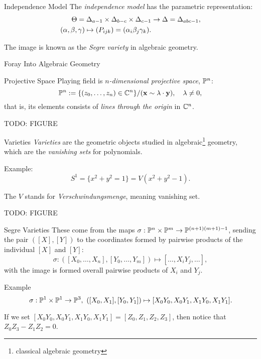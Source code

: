 \begin{frame}{Independence Model}
    The \emph{independence model} has the parametric representation:
    \begin{equation*}
        \begin{split}
            \Theta = \Delta_{a-1} \times \Delta_{b-c} \times \Delta_{c-1} &\rightarrow \Delta = \Delta_{abc - 1}, \\
            (\alpha,\beta,\gamma) \mapsto (P_{ijk}) = (\alpha_{i}\beta_{j}\gamma_{k}).
        \end{split}
    \end{equation*}

    The image is known as the \emph{Segre variety} in algebraic geometry.
\end{frame}

\begin{frame}{Foray Into Algebraic Geometry}
    \begin{block}{Projective Space}
    Playing field is $n$\emph{-dimensional projective space}, $\mathbb{P}^{n}$:
        $$ \mathbb{P}^{n} := \{ (z_{0}, \ldots, z_{n}) \in \mathbb{C}^{n} \} / (\vb{x} \sim \lambda \cdot \vb{y}), \quad \lambda \neq 0, $$
    that is, its elements consists of \emph{lines through the origin} in $\mathbb{C}^{n}$.
    \end{block}
    
    TODO: FIGURE
\end{frame}

\begin{frame}{Varieties}
        \emph{Varieties} are the geometric objects studied in algebraic\footnote{classical algebraic geometry} geometry, which are the \emph{vanishing sets} for polynomials.

        Example:
        $$ S^{1} = \{ x^{2} + y^{2} = 1 \} = V( x^{2} + y^{2} - 1 ). $$

        The $V$ stands for \emph{Verschwindungsmenge}, meaning vanishing set.

    TODO: FIGURE
\end{frame}

\begin{frame}{Segre Varieties}
        These come from the maps $\sigma: \mathbb{P}^{n} \times \mathbb{P}^{m} \rightarrow \mathbb{P}^{(n+1)(m+1) - 1}$, sending the pair $([X],[Y])$ to the coordinates formed by pairwise products of the individual $[X]$ and $[Y]$:
            $$ \sigma : ([X_{0}, \ldots, X_{n}], [Y_{0}, \ldots, Y_{m}]) \mapsto [\ldots, X_{i}Y_{j}, \ldots ], $$
        with the image is formed overall pairwise products of $X_{i}$ and $Y_{j}$.

        \begin{block}{Example}
        $$\sigma : \mathbb{P}^{1} \times \mathbb{P}^{1} \rightarrow \mathbb{P}^{3},\ ([X_{0}, X_{1}], [Y_{0}, Y_{1}]) \mapsto [ X_{0}Y_{0}, X_{0}Y_{1}, X_{1}Y_{0}, X_{1}Y_{1} ].  $$
        
        If we set $[ X_{0}Y_{0}, X_{0}Y_{1}, X_{1}Y_{0}, X_{1}Y_{1} ] = [Z_{0}, Z_{1}, Z_{2}, Z_{3}]$, then notice that $Z_{0}Z_{3} - Z_{1}Z_{2} = 0$.
        \end{block}
\end{frame}